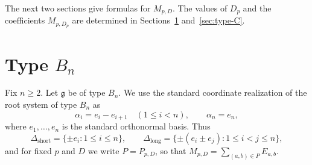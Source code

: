 \documentclass[11pt,a4paper]{amsart}
\theoremstyle{plain}
\numberwithin{equation}{section}
\def\leq{\leqslant}
\def\geq{\geqslant}
\begin{document}
The next two sections give formulas for \(M_{p,D}\).
The values of \(D_p\) and the coefficients \(M_{p,D_p}\)
are determined in Sections~\ref{sec:type-B}
and~\ref{sec:type-C}.

\section{\texorpdfstring{Type $B_n$}{Type Bn}}\label{sec:type-B}
Fix \(n\geq2\). Let
$\mathfrak g$ be of type $B_n$. We use the standard coordinate realization of the root system
of type \(B_n\) \cite{Humphreys,tauvel2005lie} as
\[
\alpha_i=e_i-e_{i+1}\quad(1\leq i<n),\qquad \alpha_n=e_n,
\]
where $e_1,\dots,e_n$ is the standard orthonormal basis. Thus
\[
\Delta_{\mathrm{short}}=\{\pm e_i:1\leq i\leq n\},\qquad
\Delta_{\mathrm{long}}=\{\pm(e_i\pm e_j):1\leq i<j\leq n\},
\]
and for fixed $p$ and $D$ we write \(P=P_{p,D}\), so that
\(M_{p,D}=\sum_{(a,b)\in P}E_{a,b}\).
\end{document}
